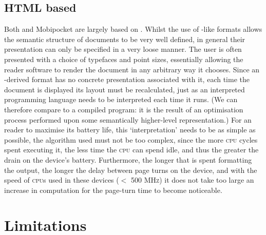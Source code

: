 \subsection{HTML based}
\label{html-format}
Both \epub{} and Mobipocket are largely based on \html{}. Whilst the use of \xml{}-like formats
allows the semantic structure of documents to be very well defined, in general their presentation
can only be specified in a very loose manner. The user is often presented with a choice of typefaces
and point sizes, essentially allowing the reader software to render the document in any arbitrary
way it chooses. Since an \html{}-derived format has no concrete presentation associated with it,
each time the document is displayed its layout must be recalculated, just as
an interpreted programming language needs to be interpreted each time it runs. (We can therefore
compare \pdf{} to a compiled program: it is the result of an optimisation process performed upon
some semantically higher-level representation.) For an \ebook{} reader to maximise its battery life,
this `interpretation' needs to be as simple as possible, \ie{} the algorithm used must not be too
complex, since the more \textsc{cpu} cycles spent executing it, the
less time the \textsc{cpu} can spend idle, and thus the greater the drain on the device's battery.
Furthermore, the longer that is spent formatting the output, the longer the delay between page turns
on the device, and with the speed of \textsc{cpu}s used in these devices ($<$ 500 \textsc{MHz}) it
does not take too large an increase in computation for the page-turn time to become noticeable.



\section{Limitations}



